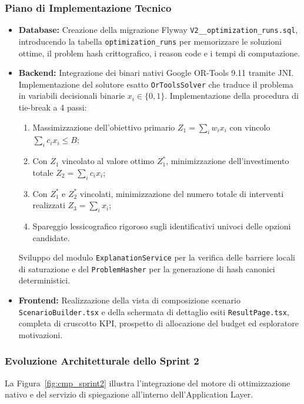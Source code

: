 \subsubsection{Piano di Implementazione Tecnico}
\begin{itemize}[leftmargin=1.4em, itemsep=0.2em]
    \item \textbf{Database:} Creazione della migrazione Flyway \texttt{V2\_\_optimization\_runs.sql}, introducendo la tabella \texttt{optimization\_runs} per memorizzare le soluzioni ottime, il problem hash crittografico, i reason code e i tempi di computazione.
    \item \textbf{Backend:} Integrazione dei binari nativi Google OR-Tools 9.11 tramite JNI. Implementazione del solutore esatto \texttt{OrToolsSolver} che traduce il problema in variabili decisionali binarie $x_i \in \{0, 1\}$. Implementazione della procedura di tie-break a 4 passi:
    \begin{enumerate}[label=\alph*), itemsep=0.1em]
        \item Massimizzazione dell'obiettivo primario $Z_1 = \sum_{i} w_i x_i$ con vincolo $\sum_i c_i x_i \le B$;
        \item Con $Z_1$ vincolato al valore ottimo $Z_1^*$, minimizzazione dell'investimento totale $Z_2 = \sum_i c_i x_i$;
        \item Con $Z_1^*$ e $Z_2^*$ vincolati, minimizzazione del numero totale di interventi realizzati $Z_3 = \sum_i x_i$;
        \item Spareggio lessicografico rigoroso sugli identificativi univoci delle opzioni candidate.
    \end{enumerate}
    Sviluppo del modulo \texttt{ExplanationService} per la verifica delle barriere locali di saturazione e del \texttt{ProblemHasher} per la generazione di hash canonici deterministici.
    \item \textbf{Frontend:} Realizzazione della vista di composizione scenario \texttt{ScenarioBuilder.tsx} e della schermata di dettaglio esiti \texttt{ResultPage.tsx}, completa di cruscotto KPI, prospetto di allocazione del budget ed esploratore motivazioni.
\end{itemize}

\subsubsection{Evoluzione Architetturale dello Sprint 2}
La Figura~\ref{fig:cmp_sprint2} illustra l'integrazione del motore di ottimizzazione nativo e del servizio di spiegazione all'interno dell'Application Layer.

